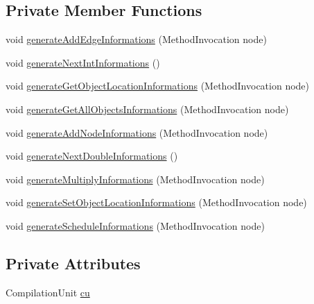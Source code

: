 \subsection*{Private Member Functions}
\begin{DoxyCompactItemize}
\item 
void \hyperlink{classit_1_1isislab_1_1masonassisteddocumentation_1_1visitor_1_1_start_step_method_visitor_a11cd1a31034690b4967546ff9250ead6}{generate\-Add\-Edge\-Informations} (Method\-Invocation node)
\item 
void \hyperlink{classit_1_1isislab_1_1masonassisteddocumentation_1_1visitor_1_1_start_step_method_visitor_ad9ba6e7095c02728b1d4f38c0927be16}{generate\-Next\-Int\-Informations} ()
\item 
void \hyperlink{classit_1_1isislab_1_1masonassisteddocumentation_1_1visitor_1_1_start_step_method_visitor_a4914dd419805eb665b631822bfd74c85}{generate\-Get\-Object\-Location\-Informations} (Method\-Invocation node)
\item 
void \hyperlink{classit_1_1isislab_1_1masonassisteddocumentation_1_1visitor_1_1_start_step_method_visitor_aaac88492e920fed7167b806a778d5dbd}{generate\-Get\-All\-Objects\-Informations} (Method\-Invocation node)
\item 
void \hyperlink{classit_1_1isislab_1_1masonassisteddocumentation_1_1visitor_1_1_start_step_method_visitor_ae25b311d9d104c6c8bf1a4842128ccfb}{generate\-Add\-Node\-Informations} (Method\-Invocation node)
\item 
void \hyperlink{classit_1_1isislab_1_1masonassisteddocumentation_1_1visitor_1_1_start_step_method_visitor_af5504e5226da24e3d40ff088853ffef4}{generate\-Next\-Double\-Informations} ()
\item 
void \hyperlink{classit_1_1isislab_1_1masonassisteddocumentation_1_1visitor_1_1_start_step_method_visitor_a2b59b62458896c8b66cc651ac352bc68}{generate\-Multiply\-Informations} (Method\-Invocation node)
\item 
void \hyperlink{classit_1_1isislab_1_1masonassisteddocumentation_1_1visitor_1_1_start_step_method_visitor_a737cae4933895eb73a56e06059cb3edf}{generate\-Set\-Object\-Location\-Informations} (Method\-Invocation node)
\item 
void \hyperlink{classit_1_1isislab_1_1masonassisteddocumentation_1_1visitor_1_1_start_step_method_visitor_a70d875f061a61b2a52bc3c3715d5a2c7}{generate\-Schedule\-Informations} (Method\-Invocation node)
\end{DoxyCompactItemize}
\subsection*{Private Attributes}
\begin{DoxyCompactItemize}
\item 
Compilation\-Unit \hyperlink{classit_1_1isislab_1_1masonassisteddocumentation_1_1visitor_1_1_start_step_method_visitor_a0bfe5ac0a34decfd8a1cc74dab7afea4}{cu}
\end{DoxyCompactItemize}
